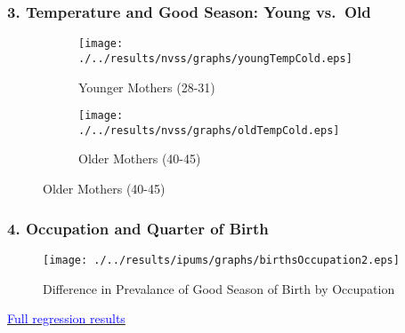 \documentclass[10pt,letterpaper,subeqn]{beamer}
\begin{document}
%





\begin{frame}[label=weather]
\frametitle{3. Temperature and Good Season: Young vs.\ Old}
\begin{figure}[htpb!]
\begin{center}
\label{fig:tempUSA}
\begin{subfigure}{.5\textwidth}
  \centering
  \texttt{[image: ./../results/nvss/graphs/youngTempCold.eps]}
  \caption{Younger Mothers (28-31)}
  \label{fig:tempUSAYoung}
\end{subfigure}%
\begin{subfigure}{.5\textwidth}
  \centering
  \texttt{[image: ./../results/nvss/graphs/oldTempCold.eps]}
  \caption{Older Mothers (40-45)}
  \label{fig:tempUSAOld}
\end{subfigure}
\end{center}
\end{figure}

\vspace{8mm}
\end{frame}




\begin{frame}[label=occGraph]
\frametitle{4. Occupation and Quarter of Birth}
\begin{figure}[htpb!]
\begin{center}
  \centering
  \caption{Difference in Prevalance of Good Season of Birth by Occupation}
  \texttt{[image: ./../results/ipums/graphs/birthsOccupation2.eps]}
  \label{fig:goodByOcc2}
\end{center}

\end{figure}
\hyperlink{occReg}{\footnotesize \textcolor{blue}{Full regression results}}
\end{frame}
\end{document}
